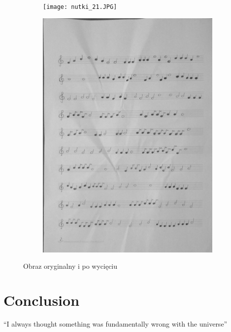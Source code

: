\documentclass{article}
\begin{document}
\begin{figure}
    \centering
    \begin{subfigure}{.5\textwidth}
        \centering
        \graphicspath{ {Resources/} }
        \texttt{[image: nutki\_21.JPG]}
        \label{fig:sub1}
    \end{subfigure}%
    \begin{subfigure}{.5\textwidth}
        \centering
        \graphicspath{ {output/} }
        \includegraphics[width=.9\linewidth]{warped21_gray.jpg}
        \label{fig:sub2}
    \end{subfigure}
    \caption{Obraz oryginalny i po wycięciu}
    \label{fig:test}
\end{figure}

\pagebreak


\section{Conclusion}
``I always thought something was fundamentally wrong with the universe'' \citep{adams1995hitchhiker}



\end{document}
